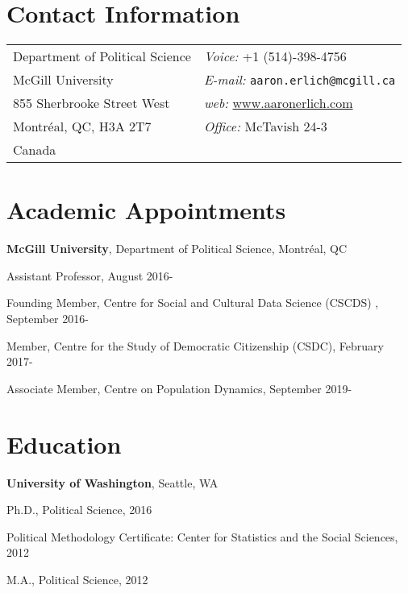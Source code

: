 \documentclass[margin,line]{res}
\newenvironment{list1}{
  \begin{list}{\ding{113}}{%
      \setlength{\itemsep}{0in}
      \setlength{\parsep}{0in} \setlength{\parskip}{0in}
      \setlength{\topsep}{0in} \setlength{\partopsep}{0in} 
      \setlength{\leftmargin}{0.17in}}}{\end{list}}
\begin{document}
\singlespacings
{\name{\textcolor{Maroon}{\LARGE	Aaron S. Erlich} \vspace*{.1in}}

\begin{resume}
\section{\sc Contact Information}
\vspace{.05in}
\begin{tabular}{@{}p{3in}p{3in}}
Department of Political Science        &    {\it Voice:} +1 (514)-398-4756 \\            
McGill University   &    {\it E-mail:} \texttt{aaron.erlich@mcgill.ca}\\         
855 Sherbrooke Street West   &        {\it web:} \url{www.aaronerlich.com}\\
Montréal, QC, H3A 2T7  &        {\it Office:}  McTavish 24-3\\
  Canada & 
\end{tabular}

\section{\sc Academic Appointments}
{\bf McGill University}, Department of Political Science, Montréal, QC 
\begin{list1}
\item[] Assistant Professor, {August 2016-}
\item[] Founding Member, Centre for Social and Cultural Data Science (CSCDS) , {September 2016-}
\item[] Member, Centre for the Study of Democratic Citizenship (CSDC), {February 2017-}
\item[] Associate Member, Centre on Population Dynamics, {September 2019-}

\end{list1}


\section{\sc Education}
{\bf University of Washington}, Seattle, WA
\begin{list1}
\item[] Ph.D., Political Science, 2016
\item[] Political Methodology Certificate: Center for Statistics and the Social Sciences, 2012
\item[] M.A., Political Science, 2012
\end{list1}



\end{resume}}
\end{document}
